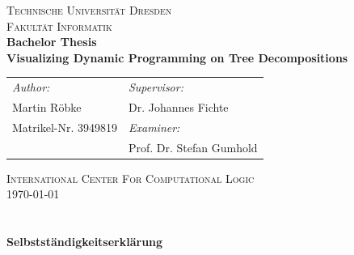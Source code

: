 \documentclass[a4paper, 12pt, bibliography=totoc]{scrartcl}
\begin{document}
\def\myauthor{Martin Röbke} 
\def\mycoauthor{Dr. Johannes Fichte} 
\def\mytitle{Visualizing Dynamic Programming on Tree Decompositions} 
\def\mydate{\today} 
\def\myabgabe{31. Juli 2020}
\def\mymatriculation{3949819}
\def\mybirthday{04.03.1995}
\def\myemail{Martin.Roebke@tu-dresden.de}

\begin{titlepage}
	\begin{center}
		\textsc{\large 
		{Technische Universität Dresden \\
			Fakultät Informatik} \\
		[8ex]}             
		{\Large\bfseries Bachelor Thesis}           \\[12ex]
		
		{\huge\bfseries \mytitle}                  \\[6.5ex]
		
		\vspace{12ex}
			
		
		{\Large 
			\begin{tabular}{p{}l}
			
				\textit{Author:}&  \textit{Supervisor:}\\
				
				\myauthor &  Dr. Johannes Fichte\\
				
			{\normalsize Matrikel-Nr. 3949819}& \textit{Examiner:}\\
				&  Prof. Dr. Stefan Gumhold\\[20ex]
				
			\end{tabular}
		}
		
		\vfill
		\textsc{International Center For Computational Logic 		\\[4ex]}
		\mydate
	\end{center}
\end{titlepage}
\newpage\newpage
\section*{ }
\thispagestyle{empty}
{\huge\bfseries{Selbstständigkeitserklärung}\vspace{20pt}}
\end{document}
